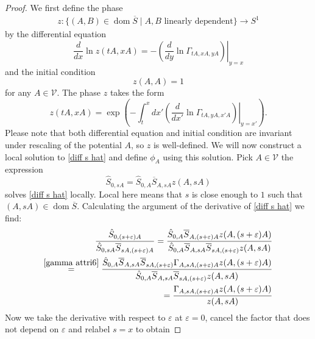 \documentclass[b5paper,draft,openbib,12pt]{memoir}
\DeclareMathOperator{\dom}{dom}
\begin{document}
\begin{proof}
We first define the phase
\begin{align}\label{def local z}
z:\{(A,B)\in\dom\overline{S}\mid A, B \text{ linearly dependent}\} \rightarrow S^1
\end{align}
by the differential equation
\begin{equation}\label{diff eq z local}
\frac{d}{d x} \ln z(t A, x A) = - \left.\left( \frac{d}{dy} \ln \Gamma_{tA,x A, yA}\right)\right|_{y=x}
\end{equation}
and the initial condition 
\begin{equation}\label{z initial}
z(A,A)=1
\end{equation}
 for any \(A\in \mathcal{V}\). The phase \(z\) takes the form
\begin{equation}\label{z solution}
z(tA,xA)=\exp\left(-\int_{t}^x dx' \left.\left( \frac{d}{dx'} \ln \Gamma_{tA,y A, x' A}\right)\right|_{y=x'}\right).
\end{equation}
Please note that both differential equation and initial condition are invariant under rescaling of the potential \(A\), so \(z\) is well-defined. 
We will now construct a local solution to \eqref{diff s hat} and define \(\phi_A\) using this solution.
Pick \(A\in \mathcal{V}\) the expression
\begin{equation}\label{loc s hat}
\hat{S}_{0,s A} = \hat{S}_{0, A} \overline{S}_{ A, s A} z( A, s A)
\end{equation}
solves \eqref{diff s hat} locally. Local here means that \(s\) is close enough to \(1\) such that \(( A, s A)\in\dom\overline{S}\).
Calculating the argument of the derivative of \eqref{diff s hat} we find:
\begin{align}
 \frac{\hat{S}_{0,(s+\varepsilon) A}}{\hat{S}_{0,s A}\overline{S}_{s A, (s+\varepsilon)A}}
= \frac{\hat{S}_{0,A} \overline{S}_{A, (s+\varepsilon)A} z(A, (s+\varepsilon)A)}
{\hat{S}_{0, A} \overline{S}_{ A, s A} \overline{S}_{s A,(s+\varepsilon)}z( A, s A)}\\
\overset{\eqref{gamma attri6}}{=}
 \frac{\hat{S}_{0,A}\overline{S}_{ A, s A} \overline{S}_{s A,(s+\varepsilon)} \Gamma_{A, sA, (s+\varepsilon)A} z(A, (s+\varepsilon)A)}
{\hat{S}_{0, A} \overline{S}_{ A, s A} \overline{S}_{s A,(s+\varepsilon)}z( A, s A)}\\
= \frac{\Gamma_{A,sA,(s+\varepsilon)A}z(A, (s+\varepsilon)A)}{z( A, sA)}
\end{align}
Now we take the derivative with respect to \(\varepsilon\) at \(\varepsilon=0\), 
cancel the factor that does not depend on \(\varepsilon\) and relabel \(s=x\) to obtain

\end{proof}
\end{document}
